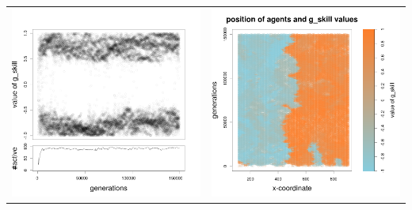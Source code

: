 \documentclass[a4paper,10pt]{article}
\begin{document}
\begin{table}[h!]
\begin{tabular}{cc}
 \newline
 \includegraphics[width=\imgSize]{images/5StaticEnv/Gplot66_staticEnv1}&\includegraphics[width=\imgSize]{images/5StaticEnv/Gplot66Static_staticEnv1}\\

\end{tabular}
\end{table}
\end{document}
